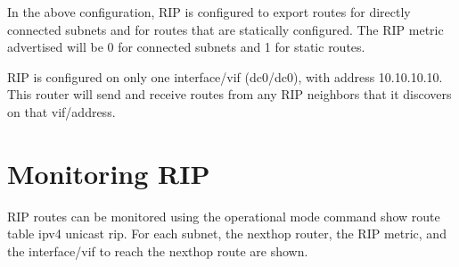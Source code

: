 \vspace{0.1in}
\noindent{}

In the above configuration, RIP is configured to export routes for
directly connected subnets and for routes that are statically
configured.  The RIP metric advertised will be 0 for connected subnets
and 1 for static routes.  

RIP is configured on only one interface/vif ({\stt dc0/dc0}), with
address 10.10.10.10.  This router will send and receive routes from
any RIP neighbors that it discovers on that vif/address.

\section{Monitoring RIP}

RIP routes can be monitored using the operational mode command {\stt
show route table ipv4 unicast rip}.  For each subnet, the nexthop
router, the RIP metric, and the interface/vif to reach the nexthop
route are shown.

